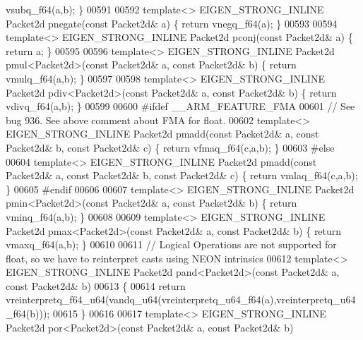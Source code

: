 \begin{DoxyCode}
{{      vsubq\_f64(a,b); \}
00591 
00592 \textcolor{keyword}{template}<> EIGEN\_STRONG\_INLINE Packet2d pnegate(\textcolor{keyword}{const} Packet2d& a) \{ \textcolor{keywordflow}{return} vnegq\_f64(a); \}
00593 
00594 \textcolor{keyword}{template}<> EIGEN\_STRONG\_INLINE Packet2d pconj(\textcolor{keyword}{const} Packet2d& a) \{ \textcolor{keywordflow}{return} a; \}
00595 
00596 \textcolor{keyword}{template}<> EIGEN\_STRONG\_INLINE Packet2d pmul<Packet2d>(\textcolor{keyword}{const} Packet2d& a, \textcolor{keyword}{const} Packet2d& b) \{ \textcolor{keywordflow}{return} 
      vmulq\_f64(a,b); \}
00597 
00598 \textcolor{keyword}{template}<> EIGEN\_STRONG\_INLINE Packet2d pdiv<Packet2d>(\textcolor{keyword}{const} Packet2d& a, \textcolor{keyword}{const} Packet2d& b) \{ \textcolor{keywordflow}{return} 
      vdivq\_f64(a,b); \}
00599 
00600 \textcolor{preprocessor}{#ifdef \_\_ARM\_FEATURE\_FMA}
00601 \textcolor{comment}{// See bug 936. See above comment about FMA for float.}
00602 \textcolor{keyword}{template}<> EIGEN\_STRONG\_INLINE Packet2d pmadd(\textcolor{keyword}{const} Packet2d& a, \textcolor{keyword}{const} Packet2d& b, \textcolor{keyword}{const} Packet2d& c) \{ \textcolor{keywordflow}{
      return} vfmaq\_f64(c,a,b); \}
00603 \textcolor{preprocessor}{#else}
00604 \textcolor{keyword}{template}<> EIGEN\_STRONG\_INLINE Packet2d pmadd(\textcolor{keyword}{const} Packet2d& a, \textcolor{keyword}{const} Packet2d& b, \textcolor{keyword}{const} Packet2d& c) \{ \textcolor{keywordflow}{
      return} vmlaq\_f64(c,a,b); \}
00605 \textcolor{preprocessor}{#endif}
00606 
00607 \textcolor{keyword}{template}<> EIGEN\_STRONG\_INLINE Packet2d pmin<Packet2d>(\textcolor{keyword}{const} Packet2d& a, \textcolor{keyword}{const} Packet2d& b) \{ \textcolor{keywordflow}{return} 
      vminq\_f64(a,b); \}
00608 
00609 \textcolor{keyword}{template}<> EIGEN\_STRONG\_INLINE Packet2d pmax<Packet2d>(\textcolor{keyword}{const} Packet2d& a, \textcolor{keyword}{const} Packet2d& b) \{ \textcolor{keywordflow}{return} 
      vmaxq\_f64(a,b); \}
00610 
00611 \textcolor{comment}{// Logical Operations are not supported for float, so we have to reinterpret casts using NEON intrinsics}
00612 \textcolor{keyword}{template}<> EIGEN\_STRONG\_INLINE Packet2d pand<Packet2d>(\textcolor{keyword}{const} Packet2d& a, \textcolor{keyword}{const} Packet2d& b)
00613 \{
00614   \textcolor{keywordflow}{return} vreinterpretq\_f64\_u64(vandq\_u64(vreinterpretq\_u64\_f64(a),vreinterpretq\_u64\_f64(b)));
00615 \}
00616 
00617 \textcolor{keyword}{template}<> EIGEN\_STRONG\_INLINE Packet2d por<Packet2d>(\textcolor{keyword}{const} Packet2d& a, \textcolor{keyword}{const} Packet2d& b)
}}
\end{DoxyCode}
